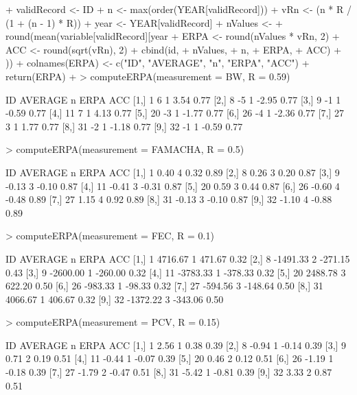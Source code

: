 \documentclass[12pt,a4paper]{paper}
\begin{document}
\begin{enumerate}
\begin{Schunk}
\begin{Sinput}
{{+     validRecord <- ID %in% id & value
+     n <- max(order(YEAR[validRecord]))
+     vRn <- (n * R / (1 + (n - 1) * R))
+     year <- YEAR[validRecord]
+     nValues <-
+       round(mean(variable[validRecord][year %in% seq_len(max(year))]), 2)
+     ERPA <- round(nValues * vRn, 2)
+     ACC <- round(sqrt(vRn), 2)
+     cbind(id,
+           nValues,
+           n,
+           ERPA,
+           ACC)
+   }))
+   colnames(ERPA) <- c("ID", "AVERAGE", "n", "ERPA", "ACC")
+   return(ERPA)
+ }
> computeERPA(measurement = BW, R = 0.59)
\end{Sinput}
\begin{Soutput}
      ID AVERAGE n  ERPA  ACC
 [1,]  1       6 1  3.54 0.77
 [2,]  8      -5 1 -2.95 0.77
 [3,]  9      -1 1 -0.59 0.77
 [4,] 11       7 1  4.13 0.77
 [5,] 20      -3 1 -1.77 0.77
 [6,] 26      -4 1 -2.36 0.77
 [7,] 27       3 1  1.77 0.77
 [8,] 31      -2 1 -1.18 0.77
 [9,] 32      -1 1 -0.59 0.77
\end{Soutput}
\begin{Sinput}
> computeERPA(measurement = FAMACHA, R = 0.5)
\end{Sinput}
\begin{Soutput}
      ID AVERAGE n  ERPA  ACC
 [1,]  1    0.40 4  0.32 0.89
 [2,]  8    0.26 3  0.20 0.87
 [3,]  9   -0.13 3 -0.10 0.87
 [4,] 11   -0.41 3 -0.31 0.87
 [5,] 20    0.59 3  0.44 0.87
 [6,] 26   -0.60 4 -0.48 0.89
 [7,] 27    1.15 4  0.92 0.89
 [8,] 31   -0.13 3 -0.10 0.87
 [9,] 32   -1.10 4 -0.88 0.89
\end{Soutput}
\begin{Sinput}
> computeERPA(measurement = FEC, R = 0.1)
\end{Sinput}
\begin{Soutput}
      ID  AVERAGE n    ERPA  ACC
 [1,]  1  4716.67 1  471.67 0.32
 [2,]  8 -1491.33 2 -271.15 0.43
 [3,]  9 -2600.00 1 -260.00 0.32
 [4,] 11 -3783.33 1 -378.33 0.32
 [5,] 20  2488.78 3  622.20 0.50
 [6,] 26  -983.33 1  -98.33 0.32
 [7,] 27  -594.56 3 -148.64 0.50
 [8,] 31  4066.67 1  406.67 0.32
 [9,] 32 -1372.22 3 -343.06 0.50
\end{Soutput}
\begin{Sinput}
> computeERPA(measurement = PCV, R = 0.15)
\end{Sinput}
\begin{Soutput}
      ID AVERAGE n  ERPA  ACC
 [1,]  1    2.56 1  0.38 0.39
 [2,]  8   -0.94 1 -0.14 0.39
 [3,]  9    0.71 2  0.19 0.51
 [4,] 11   -0.44 1 -0.07 0.39
 [5,] 20    0.46 2  0.12 0.51
 [6,] 26   -1.19 1 -0.18 0.39
 [7,] 27   -1.79 2 -0.47 0.51
 [8,] 31   -5.42 1 -0.81 0.39
 [9,] 32    3.33 2  0.87 0.51
\end{Soutput}
\end{Schunk}
\end{enumerate}
\end{document}
